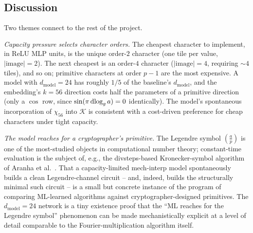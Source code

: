 \subsection{Discussion}
\label{subsec:legendre-discussion}

Two themes connect to the rest of the project.

\emph{Capacity pressure selects character orders.}  The cheapest
character to implement, in ReLU MLP units, is the unique order-$2$
character (one tile per value, $|\text{image}| = 2$).  The next
cheapest is an order-$4$ character ($|\text{image}| = 4$, requiring
$\sim 4$ tiles), and so on; primitive characters at order $p - 1$ are
the most expensive.  A model with $d_{\text{model}} = 24$ has roughly
$1/5$ of the baseline's $d_{\text{model}}$, and the embedding's $k =
56$ direction costs half the parameters of a primitive direction
(only a $\cos$ row, since $\sin(\pi \operatorname{dlog}_g a) = 0$ identically).  The
model's spontaneous incorporation of $\chi_{56}$ into $\mathcal{K}$ is
consistent with a cost-driven preference for cheap characters under
tight capacity.

\emph{The model reaches for a cryptographer's primitive.}  The
Legendre symbol $\left(\frac{a}{p}\right)$ is one of the most-studied
objects in computational number theory; constant-time evaluation is the
subject of, e.g., the divsteps-based Kronecker-symbol algorithm of
Aranha et al.\ \cite{aranha2024kronecker}.  That a capacity-limited
mech-interp model spontaneously builds a clean Legendre-channel circuit
-- and, indeed, builds the structurally minimal such circuit -- is a
small but concrete instance of the program of comparing ML-learned
algorithms against cryptographer-designed primitives.  The
$d_{\text{model}} = 24$ network is a tiny existence proof that the
``ML reaches for the Legendre symbol'' phenomenon can be made
mechanistically explicit at a level of detail comparable to the
Fourier-multiplication algorithm itself.
